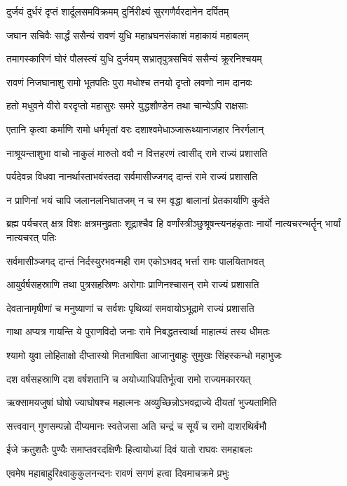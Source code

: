 \twolineshloka
{दुर्जयं दुर्धरं दृप्तं शार्दूलसमविक्रमम्}
{दुर्निरीक्ष्यं सुरगणैर्वरदानेन दर्पितम्}%

\twolineshloka
{जघान सचिवैः सार्द्धं ससैन्यं रावणं युधि}
{महाभ्रघनसंकाशं महाकायं महाबलम्}%

\twolineshloka
{तमागस्कारिणं घोरं पौलस्त्यं युधि दुर्जयम्}
{सभ्रातृपुत्रसचिवं ससैन्यं क्रूरनिश्चयम्}%

\twolineshloka
{रावणं निजघानाशु रामो भूतपतिः पुरा}
{मधोश्च तनयो दृप्तो लवणो नाम दानवः}%

\twolineshloka
{हतो मधुवने वीरो वरदृप्तो महासुरः}
{समरे युद्धशौण्डेन तथा चान्येऽपि राक्षसाः}%

\twolineshloka
{एतानि कृत्वा कर्माणि रामो धर्मभृतां वरः}
{दशाश्वमेधाञ्जारूथ्यानाजहार निरर्गलान्}%

\twolineshloka
{नाश्रूयन्ताशुभा वाचो नाकुलं मारुतो ववौ}
{न वित्तहरणं त्वासीद् रामे राज्यं प्रशासति}%

\twolineshloka
{पर्यदेवन्न विधवा नानर्थास्ताभवंस्तदा}
{सर्वमासीज्जगद् दान्तं रामे राज्यं प्रशासति}%

\twolineshloka
{न प्राणिनां भयं चापि जलानलनिघातजम्}
{न च स्म वृद्धा बालानां प्रेतकार्याणि कुर्वते}%


\threelineshloka
{ब्रह्म पर्यचरत् क्षत्र विशः क्षत्रमनुव्रताः}
{शूद्राश्चैव हि वर्णांस्त्रीञ्छुश्रूषन्त्यनहंकृताः}
{नार्यो नात्यचरन्भर्तॄन् भार्यां नात्यचरत् पतिः}%

\twolineshloka
{सर्वमासीञ्जगद् दान्तं निर्दस्युरभवन्मही}
{राम एकोऽभवद् भर्त्ता रामः पालयिताभवत्}%

\twolineshloka
{आयुर्वर्षसहस्राणि तथा पुत्रसहस्रिणः}
{अरोगाः प्राणिनश्चासन् रामे राज्यं प्रशासति}%

\twolineshloka
{देवतानामृषीणां च मनुष्याणां च सर्वशः}
{पृथिव्यां समवायोऽभूद्रामे राज्यं प्रशासति}%

\twolineshloka
{गाथा अप्यत्र गायन्ति ये पुराणविदो जनाः}
{रामे निबद्धतत्त्वार्था माहात्म्यं तस्य धीमतः}%

\twolineshloka
{श्यामो युवा लोहिताक्षो दीप्तास्यो मितभाषिता}
{आजानुबाहुः सुमुखः सिंहस्कन्धो महाभुजः}%

\twolineshloka
{दश वर्षसहस्राणि दश वर्षशतानि च}
{अयोध्याधिपतिर्भूत्वा रामो राज्यमकारयत्}%

\twolineshloka
{ऋक्सामयजुषां घोषो ज्याघोषश्च महात्मनः}
{अव्युच्छिन्नोऽभवद्राज्ये दीयतां भुज्यतामिति}%

\twolineshloka
{सत्त्ववान् गुणसम्पन्नो दीप्यमानः स्वतेजसा}
{अति चन्द्रं च सूर्यं च रामो दाशरथिर्बभौ}%

\twolineshloka
{ईजे क्रतुशतैः पुण्यैः समाप्तवरदक्षिणैः}
{हित्वायोध्यां दिवं यातो राघवः समहाबलः}%

\twolineshloka
{एवमेष महाबाहुरिक्ष्वाकुकुलनन्दनः}
{रावणं सगणं हत्वा दिवमाचक्रमे प्रभुः}%

\closesection